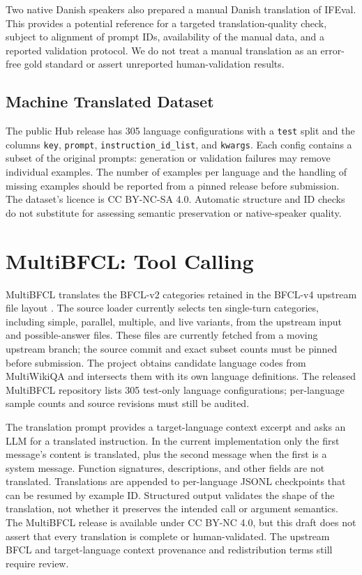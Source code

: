 \documentclass[11pt]{article}
\begin{document}
Two native Danish speakers also prepared a manual Danish translation of IFEval.
This provides a potential reference for a targeted translation-quality check,
subject to alignment of prompt IDs, availability of the manual data, and a
reported validation protocol. We do not treat a manual translation as an
error-free gold standard or assert unreported human-validation results.

\subsection{Machine Translated Dataset}
\label{sec:mt-dataset}

The public Hub release has 305 language configurations with a \texttt{test}
split and the columns \texttt{key}, \texttt{prompt},
\texttt{instruction\_id\_list}, and \texttt{kwargs}. Each config contains a
subset of the original prompts: generation or validation failures may remove
individual examples. The number of examples per language and the handling of
missing examples should be reported from a pinned release before submission.
The dataset's licence is CC BY-NC-SA 4.0. Automatic structure and ID checks do
not substitute for assessing semantic preservation or native-speaker quality.


\section{MultiBFCL: Tool Calling}
\label{sec:multi-bfcl}

MultiBFCL translates the BFCL-v2 categories retained in the BFCL-v4 upstream
file layout \cite{bfcl-upstream}. The source loader currently selects ten
single-turn categories, including simple, parallel, multiple, and live variants,
from the upstream input and possible-answer files. These files are currently
fetched from a moving upstream branch; the source commit and exact subset counts
must be pinned before submission. The project obtains candidate language codes
from MultiWikiQA and intersects them with its own language definitions. The
released MultiBFCL repository lists 305 test-only language configurations;
per-language sample counts and source revisions must still be audited.

The translation prompt provides a target-language context excerpt and asks an
LLM for a translated instruction. In the current implementation only the first
message's content is translated, plus the second message when the first is a
system message. Function signatures, descriptions, and other fields are not
translated. Translations are appended to per-language JSONL checkpoints that
can be resumed by example ID. Structured output validates the shape of the
translation, not whether it preserves the intended call or argument semantics.
The MultiBFCL release is available under CC BY-NC 4.0, but this draft does not
assert that every translation is complete or human-validated. The upstream
BFCL and target-language context provenance and redistribution terms still
require review.
\end{document}
